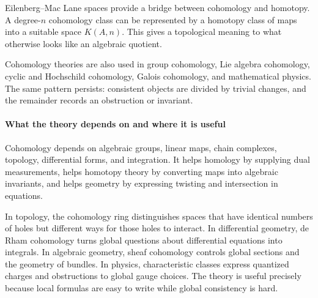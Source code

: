 Eilenberg--Mac Lane spaces provide a bridge between cohomology and homotopy. A degree-$n$ cohomology class can be represented by a homotopy class of maps into a suitable space $K(A,n)$. This gives a topological meaning to what otherwise looks like an algebraic quotient.

Cohomology theories are also used in group cohomology, Lie algebra cohomology, cyclic and Hochschild cohomology, Galois cohomology, and mathematical physics. The same pattern persists: consistent objects are divided by trivial changes, and the remainder records an obstruction or invariant. \cite{cohomology_theory_ref4,cohomology_theory_ref8}

\paragraph{What the theory depends on and where it is useful}

Cohomology depends on algebraic groups, linear maps, chain complexes, topology, differential forms, and integration. It helps homology by supplying dual measurements, helps homotopy theory by converting maps into algebraic invariants, and helps geometry by expressing twisting and intersection in equations.

In topology, the cohomology ring distinguishes spaces that have identical numbers of holes but different ways for those holes to interact. In differential geometry, de Rham cohomology turns global questions about differential equations into integrals. In algebraic geometry, sheaf cohomology controls global sections and the geometry of bundles. In physics, characteristic classes express quantized charges and obstructions to global gauge choices. The theory is useful precisely because local formulas are easy to write while global consistency is hard.

